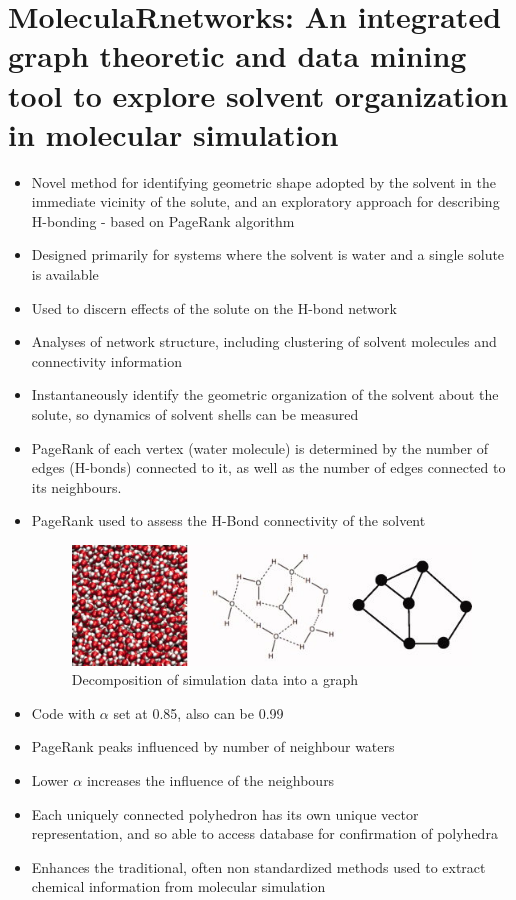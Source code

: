 \documentclass[11pt]{report}
\begin{document}
\section{MoleculaRnetworks: An integrated graph theoretic and data mining tool to explore solvent organization in molecular simulation}
\begin{itemize}
\item Novel method for identifying geometric shape adopted by the solvent in the immediate vicinity of the solute, and an exploratory approach for describing H-bonding - based on PageRank algorithm
\item Designed primarily for systems where the solvent is water and a single solute is available
\item Used to discern effects of the solute on the H-bond network
\item Analyses of network structure, including clustering of solvent molecules and connectivity information
\item Instantaneously identify the geometric organization of the solvent about the solute, so dynamics of solvent shells can be measured
\item PageRank of each vertex (water molecule) is determined by the number of edges (H-bonds) connected to it, as well as the number of edges connected to its neighbours.
\item PageRank used to assess the H-Bond connectivity of the solvent
\begin{figure}
\includegraphics[width=\linewidth]{Decomposition_of_simulation_date_into_a_graph_-chem.jpg}
\caption{Decomposition of simulation data into a graph}
\label{fig:chem}
\end{figure}
\item Code with $\alpha$ set at 0.85, also can be 0.99
\item PageRank peaks influenced by number of neighbour waters
\item Lower $\alpha$ increases the influence of the neighbours
\item Each uniquely connected polyhedron has its own unique vector representation, and so able to access database for confirmation of polyhedra
\item Enhances the traditional, often non standardized methods used to extract chemical information from molecular simulation
\end{itemize}
\end{document}
